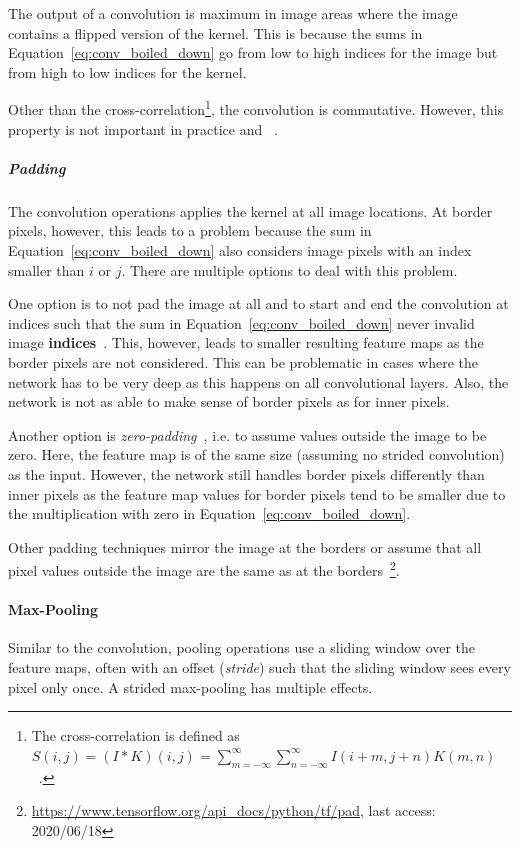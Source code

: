The output of a convolution is maximum in image areas where the image contains a flipped version of the kernel.
This is because the sums in Equation~\ref{eq:conv_boiled_down} go from low to high indices for the image but from high to low indices for the kernel.

Other than the cross-correlation\footnote{The cross-correlation is defined as $S(i, j)=(I * K)(i, j)=\sum_{m=-\infty}^{\infty} \sum_{n=-\infty}^{\infty} I(i+m, j+n) K(m, n)$~\citep[p. 329]{Goodfellow-et-al-2016}.}, the convolution is commutative.
However, this property is not important in practice and ~\citep[p. 329]{Goodfellow-et-al-2016}.

\subparagraph{Padding}
The convolution operations applies the kernel at all image locations.
At border pixels, however, this leads to a problem because the sum in Equation~\ref{eq:conv_boiled_down} also considers image pixels with an index smaller than $i$ or $j$.
There are multiple options to deal with this problem.

One option is to not pad the image at all and to start and end the convolution at indices such that the sum in Equation~\ref{eq:conv_boiled_down} never  invalid image \textbf{indices}~\citep[p. 350]{Goodfellow-et-al-2016}.
This, however, leads to smaller resulting feature maps as the border pixels are not considered.
This can be problematic in cases where the network has to be very deep as this happens on all convolutional layers.
Also, the network is not as able to make sense of border pixels as for inner pixels.

Another option is \textit{zero-padding}~\citep[p. 350]{Goodfellow-et-al-2016}, i.e. to assume values outside the image to be zero.
Here, the feature map is of the same size (assuming no strided convolution) as the input.
However, the network still handles border pixels differently than inner pixels as the feature map values for border pixels tend to be smaller due to the multiplication with zero in Equation~\ref{eq:conv_boiled_down}.

Other padding techniques mirror the image at the borders or assume that all pixel values outside the image are the same as at the borders~\footnote{\href{https://www.tensorflow.org/api\_docs/python/tf/pad}{https://www.tensorflow.org/api\_docs/python/tf/pad}, last access: 2020/06/18}.

\paragraph{Max-Pooling}
Similar to the convolution, pooling operations use a sliding window over the feature maps, often with an offset (\textit{stride}) such that the sliding window sees every pixel only once.
A strided max-pooling has multiple effects.

